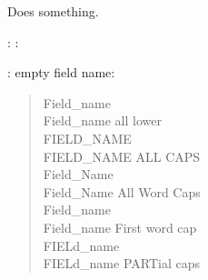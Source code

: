 \documentclass[letterpaper,10pt,english]{sphinxmanual}
\begin{document}
\begin{fulllineitems}
\label{objects:func_without_module}
Does something.

\end{fulllineitems}


\begin{fulllineitems}
\label{objects:func_without_body}
\end{fulllineitems}


\begin{fulllineitems}
\label{objects:func_with_unknown_field}
: :

: empty field name:
\begin{quote}\begin{description}
\item[{Field\_name}] \leavevmode
\item[{Field\_name all lower}] \leavevmode
\item[{FIELD\_NAME}] \leavevmode
\item[{FIELD\_NAME ALL CAPS}] \leavevmode
\item[{Field\_Name}] \leavevmode
\item[{Field\_Name All Word Caps}] \leavevmode
\item[{Field\_name}] \leavevmode
\item[{Field\_name First word cap}] \leavevmode
\item[{FIELd\_name}] \leavevmode
\item[{FIELd\_name PARTial caps}] \leavevmode
\end{description}\end{quote}

\end{fulllineitems}



\begin{fulllineitems}
\end{fulllineitems}


\begin{fulllineitems}
\label{objects:foolib.func_with_module}
\end{fulllineitems}
\end{document}
